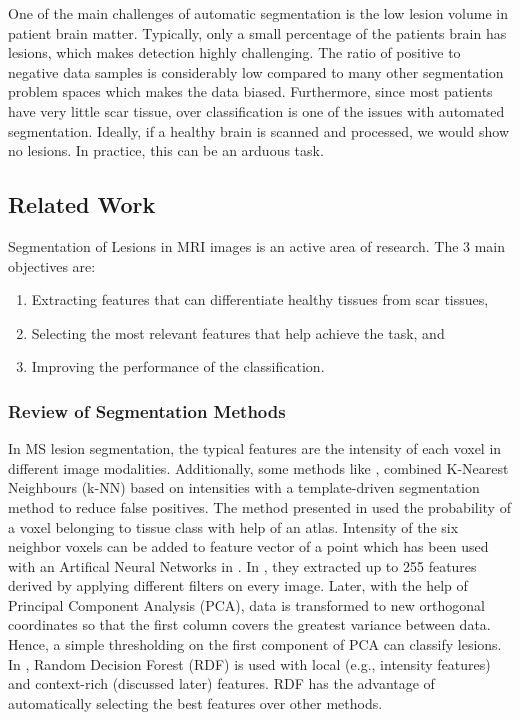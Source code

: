 \documentclass{article} %
\begin{document}
One of the main challenges of automatic segmentation is the low lesion volume in patient brain matter. Typically, only a small percentage of the patients brain has lesions, which makes detection highly challenging. The ratio of positive to negative data samples is considerably low compared to many other segmentation problem spaces which makes the data biased. Furthermore, since most patients have very little scar tissue, over classification is one of the issues with automated segmentation. Ideally, if a healthy brain is scanned and processed, we would show no lesions. In practice, this can be an arduous task.


\subsection{Related Work}
Segmentation of Lesions in MRI images is an active area of research. The 3 main objectives are: 
\begin{enumerate}
  \item Extracting features that can differentiate healthy tissues from scar tissues, 
  \item Selecting the most relevant features that help achieve the task, and
  \item Improving the performance of the classification.
\end{enumerate} 

\subsubsection{Review of Segmentation Methods}
In MS lesion segmentation, the typical features are the intensity of each voxel in different image modalities. Additionally, some methods like  \cite{commowick2009continuous}, combined K-Nearest Neighbours (k-NN) based on intensities with a template-driven segmentation method to reduce false positives. The method presented in \cite{zijdenbos2002automatic} used the probability of a voxel belonging to tissue class with help of an atlas. Intensity of the six neighbor voxels can be added to feature vector of a point which has been used with an Artifical Neural Networks in \cite{younis2007ms}. In \cite{kroon2008multiple}, they extracted up to 255 features derived by applying different filters on every image. Later, with the help of Principal Component Analysis (PCA), data is transformed to new orthogonal coordinates so that the first column covers the greatest variance between data.  Hence, a simple thresholding on the first component of PCA can classify lesions. In \cite{geremia2011spatial}, Random Decision Forest (RDF) is used with local (e.g., intensity features) and context-rich (discussed later) features. RDF has the advantage of automatically selecting the best features over other methods.
\end{document}
